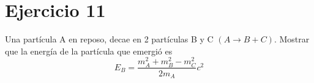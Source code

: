 \section*{Ejercicio 11}
Una partícula A en reposo, decae en 2 partículas B y C $(A\rightarrow B+C)$. Mostrar que la energía
de la partícula que emergió es 
\begin{equation*}
    E_B= \frac{m_A^2+m_B^2-m_C^2}{2m_A}c^2
\end{equation*}